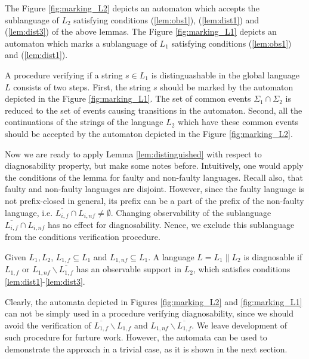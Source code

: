\documentclass[a4paper, 10pt, conference]{ieeeconf}
\begin{document}
The Figure \ref{fig:marking_L2} depicts an automaton which
accepts the sublanguage of $L_2$ satisfying conditions (\ref{lem:obs1}),
(\ref{lem:dist1}) and (\ref{lem:dist3}) of the above lemmas.
The Figure \ref{fig:marking_L1} depicts an automaton which
marks a sublanguage of $L_1$ satisfying conditions (\ref{lem:obs1}) and
(\ref{lem:dist1}). 

A procedure verifying if a string $s \in L_1$ is distinguashable in the global
language $L$ consists of two steps. First, the string $s$ should be marked by
the automaton depicted in the Figure \ref{fig:marking_L1}. The set of common
events $\Sigma_1 \cap \Sigma_2$ is reduced to the set of events causing
transitions in the automaton. Second, all the continuations of the strings of
the language $L_2$ which have these common events should be accepted by the
automaton depicted in the Figure
\ref{fig:marking_L2}.

Now we are ready to apply Lemma \ref{lem:distinguished} with respect to
diagnosability property, but make some notes before. Intuitively, one
would apply the conditions of the lemma for faulty and non-faulty
languages. Recall also, that faulty and non-faulty languages are disjoint.
However, since the faulty language is not prefix-closed in general, its prefix
can be a part of the prefix of the non-faulty language, i.e. $\overline{L_{i,f}}
\cap L_{i,nf} \neq \emptyset$. Changing observability of the
sublanguage $\overline{L_{i,f}} \cap L_{i,nf}$ has no effect for diagnosability.
Nence, we exclude this sublanguage from the conditions verification
procedure.

\begin{lemma}
\label{lem:diagnosable}
Given $L_1, L_2$, $L_{1,f} \subseteq L_1$ and $L_{1,nf} \subseteq L_1$. A
language $L = L_1 \parallel L_2$ is diagnosable if $L_{1,f}$ or $L_{1,nf}
\backslash \overline{L_{1,f}}$ has an observable support in $L_2$, which
satisfies conditions \ref{lem:dist1}-\ref{lem:dist3}.
\end{lemma}

Clearly, the automata depicted in Figures \ref{fig:marking_L2} and
\ref{fig:marking_L1} can not be simply used in a procedure verifying
diagnosability, since we should avoid the verification of $\overline{L_{1,f}}
\backslash L_{1,f}$ and $L_{1,nf} \backslash \overline{L_{1,f}}$. We leave
development of such procedure for furture work. However, the automata can be
used to demonstrate the approach in a trivial case, as it is shown in the next
section.

\end{document}
